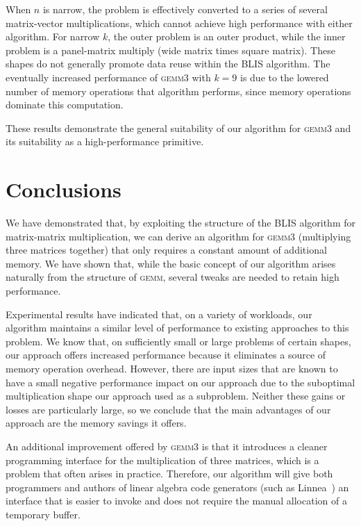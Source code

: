 \documentclass[12pt]{article}
\newcommand*{\gemmt}{{\textsc{gemm3}}}
\newcommand*{\gemm}{{\textsc{gemm}}}
\newcommand*{\mycite}[1]{~\cite{#1}}
\begin{document}
When $n$ is narrow, the problem is effectively converted to a series of several matrix-vector multiplications, which cannot achieve high performance with either algorithm.
For narrow $k$, the outer problem is an outer product, while the inner problem is a panel-matrix multiply (wide matrix times square matrix).
These shapes do not generally promote data reuse within the BLIS algorithm.
The eventually increased performance of \gemmt{} with $k = 9$ is due to the lowered number of memory operations that algorithm performs, since memory operations dominate this computation.

These results demonstrate the general suitability of our algorithm for \gemmt{} and its suitability as a high-performance primitive.

\section{Conclusions}
We have demonstrated that, by exploiting the structure of the BLIS algorithm for matrix-matrix multiplication, we can derive an algorithm for \gemmt{} (multiplying three matrices together) that only requires a constant amount of additional memory.
We have shown that, while the basic concept of our algorithm arises naturally from the structure of \gemm{}, several tweaks are needed to retain high performance.

Experimental results have indicated that, on a variety of workloads, our algorithm maintains a similar level of performance to existing approaches to this problem.
We know that, on sufficiently small or large problems of certain shapes, our approach offers increased performance because it eliminates a source of memory operation overhead.
However, there are input sizes that are known to have a small negative performance impact on our approach due to the suboptimal multiplication shape our approach used as a subproblem.
Neither these gains or losses are particularly large, so we conclude that the main advantages of our approach are the memory savings it offers.

An additional improvement offered by \gemmt{} is that it introduces a cleaner programming interface for the multiplication of three matrices, which is a problem that often arises in practice.
Therefore, our algorithm will give both programmers and authors of linear algebra code generators (such as Linnea\mycite{Barthels2017}) an interface that is easier to invoke and does not require the manual allocation of a temporary buffer.
\end{document}
